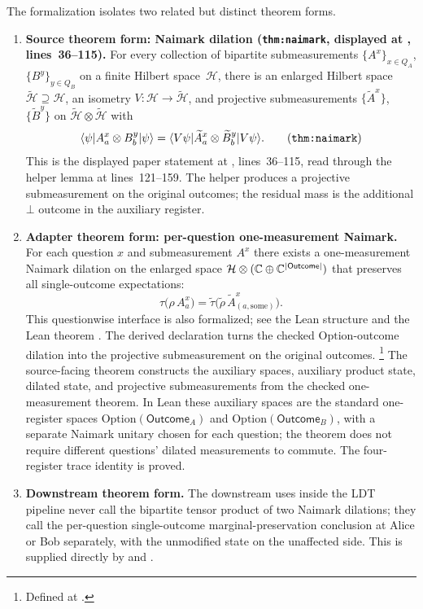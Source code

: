 \documentclass[11pt]{article}
\begin{document}
The formalization isolates two related but distinct theorem forms.
\begin{enumerate}
  \item \textbf{Source theorem form: Naimark dilation
  (\texttt{thm:naimark}, displayed at
  , lines~36--115).}
  For every collection of bipartite
  submeasurements $\{A^x\}_{x\in Q_A}$, $\{B^y\}_{y\in Q_B}$ on a finite
  Hilbert space~$\mathcal H$, there is an enlarged Hilbert space $\widetilde
  {\mathcal H}\supseteq\mathcal H$, an isometry $V:\mathcal H\to\widetilde
  {\mathcal H}$, and projective submeasurements $\{\widetilde A^x\}$,
  $\{\widetilde B^y\}$ on $\widetilde{\mathcal H}\otimes\widetilde{\mathcal H}$
  with
  \[
    \langle\psi|A^x_a\otimes B^y_b|\psi\rangle
    =\langle V\psi|\widetilde A^x_a\otimes \widetilde B^y_b|V\psi\rangle.
    \tag{\texttt{thm:naimark}}
  \]
  This is the displayed paper statement at
  , lines~36--115, read
  through the helper lemma at lines~121--159.  The helper produces a
  projective submeasurement on the original outcomes; the residual mass is the
  additional $\bot$ outcome in the auxiliary register.
  \item \textbf{Adapter theorem form: per-question one-measurement
  Naimark.}  For each question $x$ and submeasurement $A^x$ there exists a
  one-measurement Naimark dilation on the enlarged space
  $\mathcal H\otimes(\mathbb{C}\oplus\mathbb{C}^{|\textsf{Outcome}|})$ that preserves all
  single-outcome expectations:
  \[
    \tau\bigl(\rho\,A^x_a\bigr)
    =\widetilde\tau\bigl(\widetilde\rho\,\widetilde A^x_{(a,\mathrm{some})}\bigr).
  \]
  This questionwise interface is also formalized; see the Lean structure
   and the Lean theorem
  .  The derived declaration
   turns the checked
  \(\mathrm{Option}\)-outcome dilation into the projective submeasurement on
  the original outcomes.%
  \footnote{Defined at
  .}
  The source-facing theorem
   constructs the auxiliary spaces,
  auxiliary product state, dilated state, and projective submeasurements from
  the checked one-measurement theorem.  In Lean these auxiliary spaces are the
  standard one-register spaces
  \(\mathrm{Option}(\textsf{Outcome}_A)\) and
  \(\mathrm{Option}(\textsf{Outcome}_B)\), with a separate Naimark unitary
  chosen for each question; the theorem does not require different questions'
  dilated measurements to commute.  The four-register trace identity
   is proved.
  \item \textbf{Downstream theorem form.}  The downstream uses inside the LDT
  pipeline never call the bipartite tensor product of two Naimark dilations;
  they call the per-question single-outcome marginal-preservation conclusion at
  Alice or Bob separately, with the unmodified state on the unaffected side.
  This is supplied directly by  and
  .
\end{enumerate}
\end{document}
